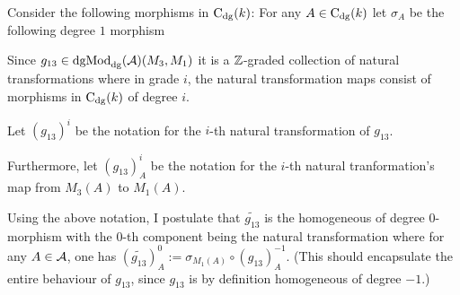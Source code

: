 \documentclass[a4paper, 12pt]{article}
\begin{document}
Consider the following morphisms in \( \operatorname{C}_{\operatorname{dg}}(k) \): For any \( A \in \operatorname{C}_{\operatorname{dg}}(k) \) let \( \sigma_A \) be the following degree \( 1 \) morphism
\begin{center}
    \newcommand{\height}{2cm}
\end{center}

Since \( g_{13} \in \operatorname{dgMod}_{\operatorname{dg}}({\mathcal{A}})(M_3, M_1) \) it is a \( {\mathbb{Z}} \)-graded collection of natural transformations where in grade \( i \), the natural transformation maps consist of morphisms in \( \operatorname{C}_{\operatorname{dg}}(k) \) of degree \( i \).

Let \( (g_{13})^i \) be the notation for the \( i \)-th natural transformation of \( g_{13} \).

Furthermore, let \( (g_{13})^i_A \) be the notation for the \( i \)-th natural tranformation's map from \( M_3(A) \) to \( M_1(A) \).

Using the above notation, I postulate that \( \widetilde{g_{13}} \) is the homogeneous of degree \( 0 \)-morphism with the \( 0 \)-th component being the natural transformation where for any \( A \in {\mathcal{A}} \), one has \( (\widetilde{g_{13}})_A^0 := \sigma_{M_1(A)} \circ (g_{13})^{-1}_A \). (This should encapsulate the entire behaviour of \( g_{13} \), since \( g_{13} \) is by definition homogeneous of degree \( -1 \).)
\end{document}

